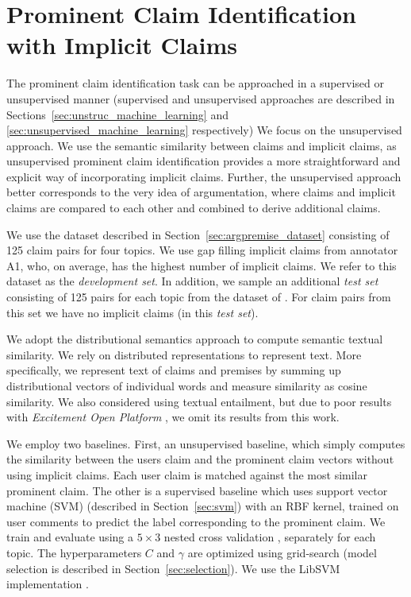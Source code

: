 \section{Prominent Claim Identification with Implicit Claims}
\label{sec:argpremise_identification}

The prominent claim identification task can be approached in a supervised or
unsupervised manner (supervised and unsupervised approaches are described in 
Sections~\ref{sec:unstruc_machine_learning} and
\ref{sec:unsupervised_machine_learning} respectively)
We focus on the unsupervised approach. 
We use the semantic similarity between claims and implicit claims, as
unsupervised prominent claim identification provides a more straightforward and
explicit way of incorporating implicit claims. 
Further, the unsupervised approach better corresponds to the very idea of
argumentation, 
where claims and implicit claims are compared to each other and combined to 
derive additional claims. 

We use the dataset described in Section~\ref{sec:argpremise_dataset} 
consisting of 125 claim pairs for four topics. 
We use gap filling implicit claims from annotator A1, who, on average, has the
highest number of implicit claims. 
We refer to this dataset as the \emph{development set}.
In addition, we sample an additional \emph{test set} consisting of 125 pairs for each topic
from the dataset of \citet{hasan2014you}. 
For claim pairs from this set we have no
implicit claims (in this \emph{test set}). 

We adopt the distributional semantics approach to compute semantic textual similarity. 
We rely on distributed representations \citep{mikolov2013distributed} to represent text. 
More specifically, we represent text of claims and premises by summing up distributional
vectors of individual words and measure similarity as cosine similarity. 
We also considered using textual entailment,
but due to poor results with \textit{Excitement Open Platform}
\citep{pado2015design}, we omit its results from this work. 

We employ two baselines.  First, an unsupervised baseline, which simply
computes the similarity between the users claim and the prominent claim vectors
without using implicit claims. 
Each user claim is matched against the most similar prominent claim. 
The other is a supervised baseline which uses support vector machine (SVM)
(described in Section~\ref{sec:svm}) with an RBF kernel, trained 
on user comments to predict the label corresponding to the 
prominent claim. 
We train and evaluate using a $5 \times 3$ nested cross validation , separately for each topic. 
The hyperparameters $C$ and $\gamma$ are optimized using grid-search
(model selection is described in Section~\ref{sec:selection}). 
We use the LibSVM implementation \citep{chang2011libsvm}. 

